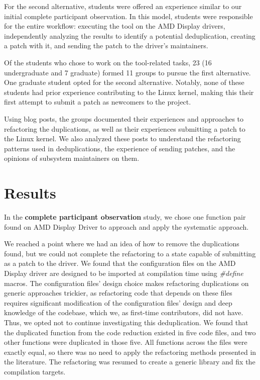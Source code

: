 \documentclass[10pt,conference]{IEEEtran}
\begin{document}
For the second alternative, students were offered an experience similar to our initial complete participant observation. In this model, students were responsible for the entire workflow: executing the tool on the AMD Display drivers, independently analyzing the results to identify a potential deduplication, creating a patch with it, and sending the patch to the driver's maintainers.

Of the students who chose to work on the tool-related tasks, 23 (16 undergraduate and 7 graduate) formed 11 groups to pursue the first alternative. One graduate student opted for the second alternative. Notably, none of these students had prior experience contributing to the Linux kernel, making this their first attempt to submit a patch as newcomers to the project.

Using blog posts, the groups documented their experiences and approaches to refactoring the duplications, as well as their experiences submitting a patch to the Linux kernel. We also analyzed these posts to understand the refactoring patterns used in deduplications, the experience of sending patches, and the opinions of subsystem maintainers on them.

\section{Results}

In the \textbf{complete participant observation} study, we chose one function pair found on AMD Display Driver to approach and apply the systematic approach.

We reached a point where we had an idea of how to remove the duplications found, but we could not complete the refactoring to a state capable of submitting as a patch to the driver. We found that the configuration files on the AMD Display driver are designed to be imported at compilation time using \textit{\#define} macros. The configuration files' design choice makes refactoring duplications on generic approaches trickier, as refactoring code that depends on these files requires significant modification of the configuration files' design and deep knowledge of the codebase, which we, as first-time contributors, did not have. Thus, we opted not to continue investigating this deduplication. We found that the duplicated function from the code reduction existed in five code files, and two other functions were duplicated in those five. All functions across the files were exactly equal, so there was no need to apply the refactoring methods presented in the literature. The refactoring was resumed to create a generic library and fix the compilation targets.
\end{document}
